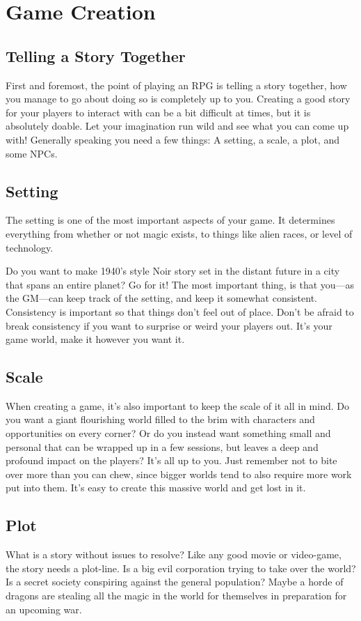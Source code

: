 \chapter{Game Creation}
\section{Telling a Story Together}
First and foremost, the point of playing an RPG is telling a story together, how you manage to go about doing so is completely up to you.
Creating a good story for your players to interact with can be a bit difficult at times, but it is absolutely doable.
Let your imagination run wild and see what you can come up with!
Generally speaking you need a few things: A setting, a scale, a plot, and some NPCs.

\section{Setting}
The setting is one of the most important aspects of your game.
It determines everything from whether or not magic exists, to things like alien races, or level of technology.

Do you want to make 1940's style Noir story set in the distant future in a city that spans an entire planet? Go for it!
The most important thing, is that you---as the GM---can keep track of the setting, and keep it somewhat consistent.
Consistency is important so that things don't feel out of place. 
Don't be afraid to break consistency if you want to surprise or weird your players out.
It's your game world, make it however you want it.

\section{Scale}
When creating a game, it's also important to keep the scale of it all in mind.
Do you want a giant flourishing world filled to the brim with characters and opportunities on every corner? 
Or do you instead want something small and personal that can be wrapped up in a few sessions, but leaves a deep and profound impact on the players?
It's all up to you.
Just remember not to bite over more than you can chew, since bigger worlds tend to also require more work put into them.
It's easy to create this massive world and get lost in it.

\section{Plot}
What is a story without issues to resolve? Like any good movie or video-game, the story needs a plot-line.
Is a big evil corporation trying to take over the world?
Is a secret society conspiring against the general population?
Maybe a horde of dragons are stealing all the magic in the world for themselves in preparation for an upcoming war.

